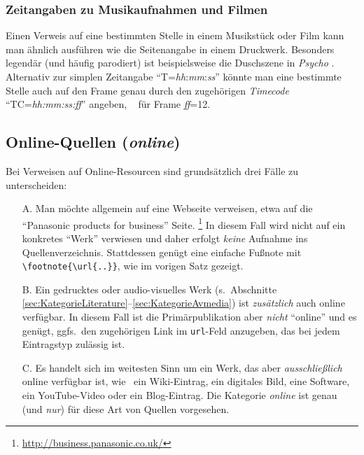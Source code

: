 \subsubsection{Zeitangaben zu Musikaufnahmen und Filmen} 

Einen Verweis auf eine bestimmten Stelle in einem Musikstück oder Film kann man 
ähnlich ausführen wie die Seitenangabe in einem Druckwerk.
Besonders legendär (und häufig parodiert) ist beispielsweise die Duschszene
in \emph{Psycho} \cite[T=00:32:10]{Psycho1960}.
Alternativ zur simplen Zeitangabe "`T=\emph{hh}:\emph{mm}:\emph{ss}"' 
könnte man eine bestimmte Stelle auch auf den Frame genau durch 
den zugehörigen \emph{Timecode} "`TC=\emph{hh:mm:ss:ff}"' angeben, 
\zB\ \cite[TC=00:32:10:12]{Psycho1960} für Frame \emph{ff}=12.



\subsection{Online-Quellen (\emph{online})}
\label{sec:KategorieOnline}

Bei Verweisen auf Online-Resourcen sind grundsätzlich drei Fälle zu unterscheiden:
%
\begin{itemize}
\item[A.] Man möchte allgemein auf eine Webseite verweisen, etwa auf die 
	"`Panasonic products for business"' Seite.%
	\footnote{\url{http://business.panasonic.co.uk/}}
	In diesem Fall wird nicht auf ein konkretes "`Werk"' verwiesen und daher
	erfolgt \emph{keine} Aufnahme ins Quellenverzeichnis. Stattdessen
	genügt eine einfache Fußnote mit \verb!\footnote{\url{..}}!, wie im vorigen
	Satz gezeigt.
\item[B.] Ein gedrucktes oder audio-visuelles Werk 
	(s.\ Abschnitte \ref{sec:KategorieLiterature}--\ref{sec:KategorieAvmedia})
	ist \emph{zusätzlich} auch online verfügbar. In diesem Fall ist die Primär\-publikation 
	aber \emph{nicht} "`online"' und es genügt, ggfs.\ den zugehörigen Link im 
	\texttt{url}-Feld anzugeben, das bei jedem Eintragstyp zulässig ist.
\item[C.] Es handelt sich im weitesten Sinn um ein Werk, das aber 
	\emph{ausschließlich} online verfügbar ist, wie \zB\ ein Wiki-Eintrag, 
	ein digitales Bild,	eine Software, ein YouTube-Video oder ein Blog-Eintrag.
	Die Kategorie \emph{online} ist genau (und \emph{nur}) für diese 
	Art von Quellen vorgesehen.
\end{itemize}




